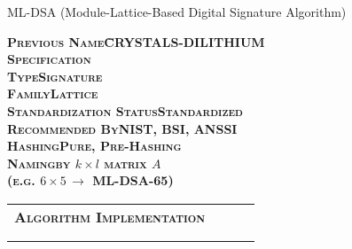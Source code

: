 \documentclass[11pt,english,a4paper, landscape]{scrartcl}
\begin{document}
	\begin{algorithmbox}{ML-DSA (Module-Lattice-Based Digital Signature Algorithm)}
		\begin{minipage}[t]{0.35\textwidth}
			\scriptsize
			\begin{center}
			\end{center}

			\begin{tabbing}
				\bfseries \scshape Previous Name\hspace{2.5cm}\=CRYSTALS-DILITHIUM\\
				\bfseries \scshape Specification\>\\
				\bfseries \scshape Type\>Signature\\
				\bfseries \scshape Family\>Lattice\\
				\bfseries \scshape Standardization Status\>Standardized\\
				\bfseries \scshape Recommended By\>NIST, BSI, ANSSI\\
				\bfseries \scshape Hashing\>Pure, Pre-Hashing\\
				\bfseries \scshape Naming\>by $k\times l$ matrix $A$\\
				\>(e.g. $6\times5\,\rightarrow$ ML-DSA-65)
			\end{tabbing}
			\begin{tabular}[t]{l c  c  c}
				\scshape\bfseries Algorithm Implementation &\textcolor{themegreydark}{\faKey}&\textcolor{themegreydark}{\faPen}&\textcolor{themegreydark}{\faQuestionCircle}\\
				&&&\\
				\hline\\


\end{tabular}
\end{minipage}
\end{algorithmbox}
\end{document}
